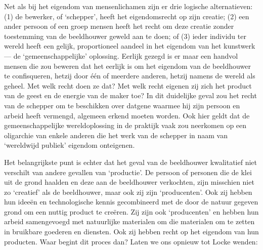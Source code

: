 \documentclass[
  a5paper,
  smalldemyvopaper,10pt,twoside,onecolumn,openright,extrafontsizes,hidelinks]{memoir}
\begin{document}
Net als bij het eigendom van mensenlichamen zijn er drie logische
alternatieven: (1) de bewerker, of `schepper', heeft het eigendomsrecht
op zijn creatie; (2) een ander persoon of een groep mensen heeft het
recht om deze creatie zonder toestemming van de beeldhouwer geweld aan
te doen; of (3) ieder individu ter wereld heeft een gelijk,
proportioneel aandeel in het eigendom van het kunstwerk --- de
`gemeenschappelijke' oplossing. Eerlijk gezegd is er maar een handvol
mensen die zou beweren dat het eerlijk is om het eigendom van de
beeldhouwer te confisqueren, hetzij door één of meerdere anderen, hetzij
namens de wereld als geheel. Met welk recht doen ze dat? Met welk recht
eigenen zij zich het product van de geest en de energie van de maker
toe? In dit duidelijke geval zou het recht van de schepper om te
beschikken over datgene waarmee hij zijn persoon en arbeid heeft
vermengd, algemeen erkend moeten worden. Ook hier geldt dat de
gemeenschappelijke wereldoplossing in de praktijk vaak zou neerkomen op
een oligarchie van enkele anderen die het werk van de schepper in naam
van `wereldwijd publiek' eigendom onteigenen.

Het belangrijkste punt is echter dat het geval van de beeldhouwer
kwalitatief niet verschilt van andere gevallen van `productie'. De
persoon of personen die de klei uit de grond haalden en deze aan de
beeldhouwer verkochten, zijn misschien niet zo `creatief' als de
beeldhouwer, maar ook zij zijn `producenten'. Ook zij hebben hun ideeën
en technologische kennis gecombineerd met de door de natuur gegeven
grond om een nuttig product te creëren. Zij zijn ook `producenten' en
hebben hun arbeid samengevoegd met natuurlijke materialen om die
materialen om te zetten in bruikbare goederen en diensten. Ook zij
hebben recht op het eigendom van hun producten. Waar begint dit proces
dan? Laten we ons opnieuw tot Locke wenden:
\end{document}
